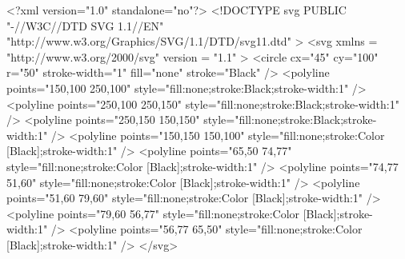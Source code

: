 <?xml version="1.0" standalone="no"?> 
<!DOCTYPE svg PUBLIC "-//W3C//DTD SVG 1.1//EN"
"http://www.w3.org/Graphics/SVG/1.1/DTD/svg11.dtd" >
<svg xmlns = "http://www.w3.org/2000/svg" version = "1.1" >
<circle cx="45" cy="100" r="50" stroke-width="1" fill="none" stroke="Black" />
<polyline points="150,100 250,100" style="fill:none;stroke:Black;stroke-width:1" />
<polyline points="250,100 250,150" style="fill:none;stroke:Black;stroke-width:1" />
<polyline points="250,150 150,150" style="fill:none;stroke:Black;stroke-width:1" />
<polyline points="150,150 150,100" style="fill:none;stroke:Color [Black];stroke-width:1" />
<polyline points="65,50 74,77" style="fill:none;stroke:Color [Black];stroke-width:1" />
<polyline points="74,77 51,60" style="fill:none;stroke:Color [Black];stroke-width:1" />
<polyline points="51,60 79,60" style="fill:none;stroke:Color [Black];stroke-width:1" />
<polyline points="79,60 56,77" style="fill:none;stroke:Color [Black];stroke-width:1" />
<polyline points="56,77 65,50" style="fill:none;stroke:Color [Black];stroke-width:1" />
</svg>